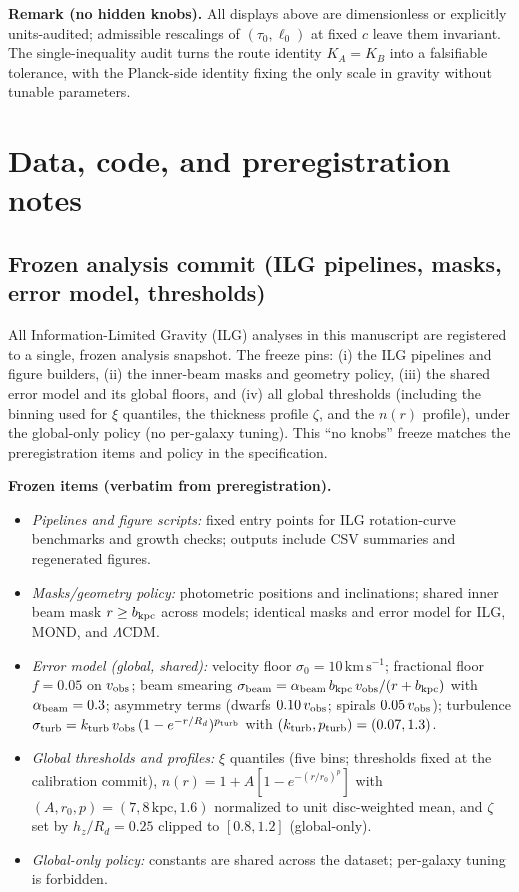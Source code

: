 \documentclass[11pt]{article}
\begin{document}
\medskip
\noindent\textbf{Remark (no hidden knobs).} All displays above are dimensionless or explicitly units-audited; admissible rescalings of $(\tau_0,\ell_0)$ at fixed $c$ leave them invariant. The single-inequality audit turns the route identity $K_A=K_B$ into a falsifiable tolerance, with the Planck-side identity fixing the only scale in gravity without tunable parameters. 

\section{Data, code, and preregistration notes}

\subsection*{Frozen analysis commit (ILG pipelines, masks, error model, thresholds)}
All Information-Limited Gravity (ILG) analyses in this manuscript are registered to a single, frozen analysis snapshot. The freeze pins: (i) the ILG pipelines and figure builders, (ii) the inner-beam masks and geometry policy, (iii) the shared error model and its global floors, and (iv) all global thresholds (including the binning used for $\xi$ quantiles, the thickness profile $\zeta$, and the $n(r)$ profile), under the global-only policy (no per-galaxy tuning). This ``no knobs'' freeze matches the preregistration items and policy in the specification.   

\medskip
\noindent\textbf{Frozen items (verbatim from preregistration).}
\begin{itemize}
  \item \emph{Pipelines and figure scripts:} fixed entry points for ILG rotation-curve benchmarks and growth checks; outputs include CSV summaries and regenerated figures. 
  \item \emph{Masks/geometry policy:} photometric positions and inclinations; shared inner beam mask $r \ge b_{\rm kpc}$ across models; identical masks and error model for ILG, MOND, and $\Lambda$CDM. 
  \item \emph{Error model (global, shared):} velocity floor $\sigma_0=10\,\mathrm{km\,s^{-1}}$; fractional floor $f=0.05$ on $v_{\rm obs}$; beam smearing $\sigma_{\rm beam}=\alpha_{\rm beam}\,b_{\rm kpc}\,v_{\rm obs}/(r+b_{\rm kpc})$ with $\alpha_{\rm beam}=0.3$; asymmetry terms (dwarfs $0.10\,v_{\rm obs}$; spirals $0.05\,v_{\rm obs}$); turbulence $\sigma_{\rm turb}=k_{\rm turb}\,v_{\rm obs}\,(1-e^{-r/R_d})^{p_{\rm turb}}$ with $(k_{\rm turb},p_{\rm turb})=(0.07,1.3)$. 
  \item \emph{Global thresholds and profiles:} $\xi$ quantiles (five bins; thresholds fixed at the calibration commit), $n(r)=1+A[1-e^{-(r/r_0)^p}]$ with $(A,r_0,p)=(7,8\,\mathrm{kpc},1.6)$ normalized to unit disc-weighted mean, and $\zeta$ set by $h_z/R_d=0.25$ clipped to $[0.8,1.2]$ (global-only). 
  \item \emph{Global-only policy:} constants are shared across the dataset; per-galaxy tuning is forbidden. 
\end{itemize}
\end{document}
